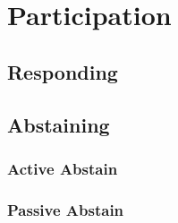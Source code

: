 \chapter{Participation}

\section{Responding}

\subsection{}

\section{Abstaining}

\subsection{Active Abstain}

\subsection{Passive Abstain}
